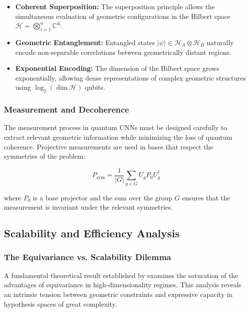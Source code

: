 \begin{itemize}
\item \textbf{Coherent Superposition:} The superposition principle allows the simultaneous evaluation of geometric configurations in the Hilbert space $\mathcal{H} = \bigotimes_{i=1}^n \mathbb{C}^{d_i}$.
\item \textbf{Geometric Entanglement:} Entangled states $|\psi\rangle \in \mathcal{H}_A \otimes \mathcal{H}_B$ naturally encode non-separable correlations between geometrically distant regions.
\item \textbf{Exponential Encoding:} The dimension of the Hilbert space grows exponentially, allowing dense representations of complex geometric structures using $\log_2(\dim \mathcal{H})$ qubits.
\end{itemize}

\subsubsection{Measurement and Decoherence}

The measurement process in quantum CNNs must be designed carefully to extract relevant geometric information while minimizing the loss of quantum coherence. Projective measurements are used in bases that respect the symmetries of the problem:

\begin{equation}
P_{\text{sym}} = \frac{1}{|G|} \sum_{g \in G} U_g P_0 U_g^\dagger
\end{equation}

where $P_0$ is a base projector and the sum over the group $G$ ensures that the measurement is invariant under the relevant symmetries.

\subsection{Scalability and Efficiency Analysis}

\subsubsection{The Equivariance vs. Scalability Dilemma}

A fundamental theoretical result established by \citet{park2024equivariancescale} examines the saturation of the advantages of equivariance in high-dimensionality regimes. This analysis reveals an intrinsic tension between geometric constraints and expressive capacity in hypothesis spaces of great complexity.

